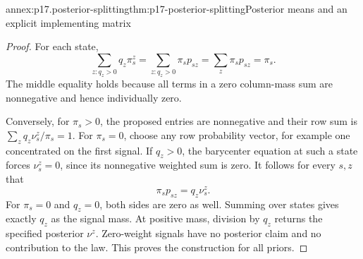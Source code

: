 \begin{annexitem}{annex:p17.posterior-splitting}{thm:p17-posterior-splitting}{Posterior means and an explicit implementing matrix}
\begin{proof}
For each state,
\[
 \sum_{z:q_z>0}q_z\pi_s^z
   =\sum_{z:q_z>0}\pi_s p_{sz}
   =\sum_z\pi_s p_{sz}=\pi_s.
\]
The middle equality holds because all terms in a zero column-mass
sum are nonnegative and hence individually zero.

Conversely, for \(\pi_s>0\), the proposed entries are nonnegative
and their row sum is
\(\sum_zq_z\nu_s^z/\pi_s=1\).
For \(\pi_s=0\), choose any row probability vector, for example
one concentrated on the first signal. If \(q_z>0\), the barycenter
equation at such a state forces \(\nu_s^z=0\), since its nonnegative
weighted sum is zero.
It follows for every \(s,z\) that
\[
                         \pi_s p_{sz}=q_z\nu_s^z.
\]
For \(\pi_s=0\) and \(q_z=0\), both sides are zero as well.
Summing over states gives exactly \(q_z\) as the signal mass.
At positive mass, division by \(q_z\) returns the specified posterior
\(\nu^z\). Zero-weight signals have no posterior claim and no
contribution to the law. This proves the construction for all priors.
\end{proof}
\end{annexitem}

